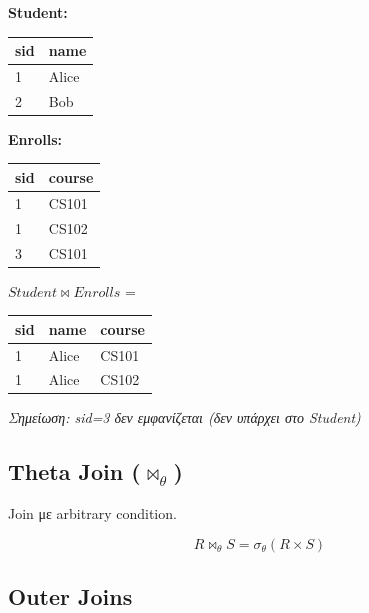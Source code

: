 \begin{examplebox}
\textbf{Student:}
\begin{tabular}{ll}
\toprule
\textbf{sid} & \textbf{name} \\
\midrule
1 & Alice \\
2 & Bob \\
\bottomrule
\end{tabular}
\quad
\textbf{Enrolls:}
\begin{tabular}{ll}
\toprule
\textbf{sid} & \textbf{course} \\
\midrule
1 & CS101 \\
1 & CS102 \\
3 & CS101 \\
\bottomrule
\end{tabular}

\vspace{0.3cm}

$Student \bowtie Enrolls$ =

\begin{center}
\begin{tabular}{lll}
\toprule
\textbf{sid} & \textbf{name} & \textbf{course} \\
\midrule
1 & Alice & CS101 \\
1 & Alice & CS102 \\
\bottomrule
\end{tabular}
\end{center}

\textit{Σημείωση: sid=3 δεν εμφανίζεται (δεν υπάρχει στο Student)}
\end{examplebox}

\subsection{Theta Join (\texorpdfstring{$\bowtie_\theta$}{theta-join})}

\begin{formulabox}
Join με arbitrary condition.

\[
R \bowtie_{\theta} S = \sigma_{\theta}(R \times S)
\]
\end{formulabox}

\subsection{Outer Joins}

